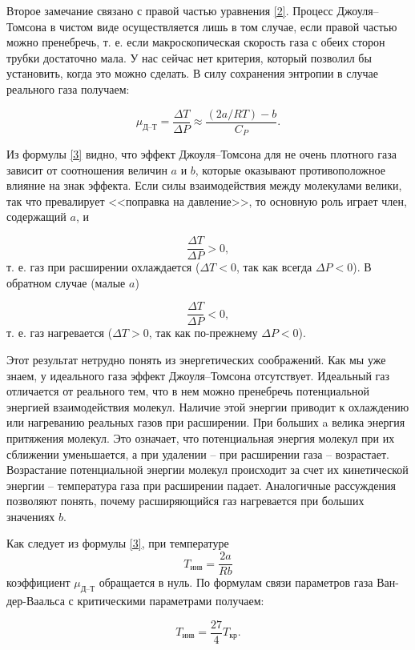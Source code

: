 \documentclass[a4paper,12pt]{article} %
\begin{document}
Второе замечание связано с правой частью уравнения \eqref{2}. Процесс Джоуля–Томсона в чистом виде осуществляется лишь в том случае, если правой частью можно пренебречь, т. е. если макроскопическая скорость газа с обеих сторон трубки достаточно мала. У нас сейчас нет критерия, который позволил бы установить, когда это можно сделать. В силу сохранения энтропии в случае реального газа получаем:

\begin{equation}\label{3}
\mu_\text{Д--Т} = \frac{\Delta T}{\Delta P} \approx \frac{(2a/RT) - b}{C_P}.
\end{equation}

Из формулы \eqref{3} видно, что эффект Джоуля–Томсона для не очень плотного газа зависит от соотношения величин $ a $ и $ b $, которые оказывают противоположное влияние на знак эффекта. Если силы взаимодействия между молекулами велики, так что превалирует <<поправка на давление>>, то основную роль играет член, содержащий $ a $, и 

\[ \frac{\Delta T}{\Delta P} > 0, \]
т. е. газ при расширении охлаждается ($ \Delta T < 0 $, так как всегда $ \Delta P < 0 $). В обратном случае (малые $ a $)

\[ \frac{\Delta T}{\Delta P} < 0, \]
т. е. газ нагревается ($ \Delta T > 0 $, так как по-прежнему $ \Delta P < 0 $).

Этот результат нетрудно понять из энергетических соображений. Как мы уже знаем, у идеального газа эффект Джоуля–Томсона отсутствует. Идеальный газ отличается от реального тем, что в нем можно пренебречь потенциальной энергией взаимодействия молекул. Наличие этой энергии приводит к охлаждению или нагреванию реальных газов при расширении. При больших a велика энергия притяжения молекул. Это означает, что потенциальная энергия молекул при их сближении уменьшается, а при удалении -- при расширении газа -- возрастает. Возрастание потенциальной энергии молекул происходит за счет их кинетической энергии -- температура газа при расширении падает. Аналогичные рассуждения позволяют понять, почему расширяющийся газ нагревается при больших значениях $ b $.

Как следует из формулы \eqref{3}, при температуре \[ T_{\text{инв}} = \frac{2a}{Rb} \] коэффициент $ \mu_\text{Д--Т} $ обращается в нуль. По формулам связи параметров газа Ван-дер-Ваальса с критическими параметрами получаем: 

\begin{equation}\label{4}
T_\text{инв} = \frac{27}{4} T_\text{кр}.
\end{equation}
\end{document}
